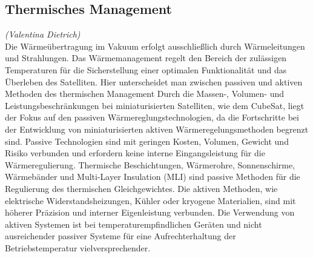		\subsection{Thermisches Management}%
		\hfill\emph{(Valentina Dietrich)}\\
Die Wärmeübertragung im Vakuum erfolgt ausschließlich durch Wärmeleitungen und Strahlungen. Das Wärmemanagement regelt den Bereich der zulässigen Temperaturen für die Sicherstellung einer optimalen Funktionalität und das Überleben des Satelliten. Hier unterscheidet man zwischen passiven und aktiven Methoden des thermischen Management  Durch die Massen-, Volumen- und Leistungsbeschränkungen bei miniaturisierten Satelliten, wie dem CubeSat, liegt der Fokus auf den passiven Wärmereglungstechnologien, da die Fortschritte bei der Entwicklung von miniaturisierten aktiven Wärmeregelungsmethoden begrenzt sind. Passive Technologien sind mit geringen Kosten, Volumen, Gewicht und Risiko verbunden und erfordern keine interne Eingangsleistung für die Wärmeregulierung. Thermische Beschichtungen, Wärmerohre, Sonnenschirme, Wärmebänder und Multi-Layer Insulation (MLI) sind passive Methoden für die Regulierung des thermischen Gleichgewichtes. Die aktiven Methoden, wie elektrische Widerstandsheizungen, Kühler oder kryogene Materialien, sind mit höherer Präzision und interner Eigenleistung verbunden. Die Verwendung von aktiven Systemen ist bei temperaturempfindlichen Geräten und nicht ausreichender passiver Systeme für eine Aufrechterhaltung der Betriebstemperatur vielversprechender. \cite[S. 109 - 120]{NASA.Sota.2018} 

